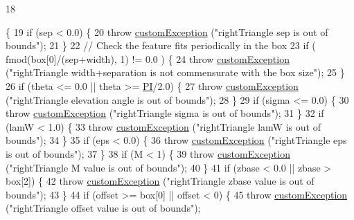 \begin{DoxyCode}
18                                                                                                            
                                                                                                                  
                                   \{
19     \textcolor{keywordflow}{if} (sep < 0.0) \{
20         \textcolor{keywordflow}{throw} \hyperlink{classcustom_exception}{customException} (\textcolor{stringliteral}{"rightTriangle sep is out of bounds"});
21     \}
22     \textcolor{comment}{// Check the feature fits periodically in the box}
23     \textcolor{keywordflow}{if} ( fmod(box[0]/(sep+width), 1) != 0.0 ) \{
24         \textcolor{keywordflow}{throw} \hyperlink{classcustom_exception}{customException} (\textcolor{stringliteral}{"rightTriangle width+separation is not commensurate with the
       box size"});
25     \}
26     \textcolor{keywordflow}{if} (theta <= 0.0 || theta >= \hyperlink{global_8h_a598a3330b3c21701223ee0ca14316eca}{PI}/2.0) \{
27         \textcolor{keywordflow}{throw} \hyperlink{classcustom_exception}{customException} (\textcolor{stringliteral}{"rightTriangle elevation angle is out of bounds"});
28     \}
29     \textcolor{keywordflow}{if} (sigma <= 0.0) \{
30         \textcolor{keywordflow}{throw} \hyperlink{classcustom_exception}{customException} (\textcolor{stringliteral}{"rightTriangle sigma is out of bounds"});
31     \}
32     \textcolor{keywordflow}{if} (lamW < 1.0) \{
33         \textcolor{keywordflow}{throw} \hyperlink{classcustom_exception}{customException} (\textcolor{stringliteral}{"rightTriangle lamW is out of bounds"});
34     \}
35     \textcolor{keywordflow}{if} (eps < 0.0) \{
36         \textcolor{keywordflow}{throw} \hyperlink{classcustom_exception}{customException} (\textcolor{stringliteral}{"rightTriangle eps is out of bounds"});
37     \}
38     \textcolor{keywordflow}{if} (M < 1) \{
39         \textcolor{keywordflow}{throw} \hyperlink{classcustom_exception}{customException} (\textcolor{stringliteral}{"rightTriangle M value is out of bounds"});
40     \}
41     \textcolor{keywordflow}{if} (zbase < 0.0 || zbase > box[2]) \{
42         \textcolor{keywordflow}{throw} \hyperlink{classcustom_exception}{customException} (\textcolor{stringliteral}{"rightTriangle zbase value is out of bounds"});
43     \}
44     \textcolor{keywordflow}{if} (offset >= box[0] || offset < 0) \{
45         \textcolor{keywordflow}{throw} \hyperlink{classcustom_exception}{customException} (\textcolor{stringliteral}{"rightTriangle offset value is out of bounds"});

\end{DoxyCode}
